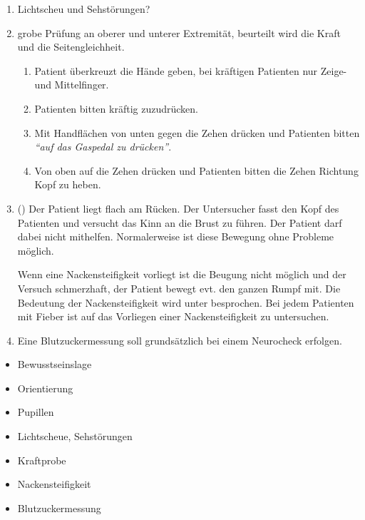 {\begin{enumerate}
\begin{enumerate}
  Beurteilung von:
  \begin{enumerate}
      \item Orientierung zu Person, Ort, Zeit und Situation.
  \item Schnelligkeit der Reaktion: prompt, verzögert?
  \item Reagieren immer beide
  Pupillen?~
    \end{enumerate}
\end{enumerate}
  \item Lichtscheu und Sehstörungen?
  \item {} grobe Prüfung an oberer und
  unterer Extremität, beurteilt wird die Kraft und die
  Seitengleichheit. 
    \begin{enumerate}
  \item Patient überkreuzt die Hände geben, bei kräftigen
  Patienten nur Zeige- und Mittelfinger.
  \item Patienten bitten kräftig zuzudrücken.
  \item Mit Handflächen von unten gegen die Zehen drücken
  und Patienten bitten \emph{"`auf das Gaspedal zu
  drücken"'}.
  \item Von oben auf die Zehen drücken und Patienten bitten
  die Zehen Richtung Kopf zu heben.
\end{enumerate}
  \item {} () Der
  Patient liegt flach am Rücken. Der Untersucher fasst den
  Kopf des Patienten und versucht das Kinn an die Brust zu
  führen. Der Patient darf dabei nicht mithelfen.
  Normalerweise ist diese Bewegung ohne Probleme möglich.
  
  Wenn eine Nackensteifigkeit vorliegt ist die Beugung nicht
  möglich und der Versuch schmerzhaft, der Patient bewegt
  evt. den ganzen Rumpf mit. Die Bedeutung der
  Nackensteifigkeit wird unter 
  besprochen. Bei jedem Patienten mit Fieber ist auf das
  Vorliegen einer Nackensteifigkeit zu untersuchen.  
  \item {} Eine Blutzuckermessung soll
  grundsätzlich bei einem Neurocheck erfolgen.
\end{enumerate}
}{
\begin{itemize}
  \item Bewusstseinslage
  \item Orientierung
  \item Pupillen
  \item Lichtscheue, Sehstörungen
  \item Kraftprobe
  \item Nackensteifigkeit
  \item Blutzuckermessung
\end{itemize}
}{}{}{}

